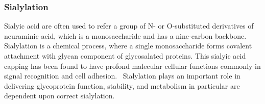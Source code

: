 \subsubsection {Sialylation}
Sialyic acid are often used to refer a group of N- or O-substituted derivatives of neuraminic acid, which is a monosaccharide and has a nine-carbon backbone.~\cite{Vocadlo_2009} Sialylation is a chemical process, where a single monosaccharide forms covalent attachment with glycan component of glycosalated proteins. This sialyic acid capping has been found to have profond malecular cellular functions commonly in signal recognition and cell adhesion.~\cite{Bhide_2016} Sialylation plays an important role in delivering glycoprotein function, stability, and metabolism in particular are dependent upon correct sialylation.
